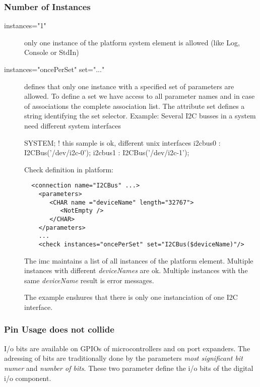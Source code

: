 \subsubsection{Number of Instances}
\begin{description}
\item[instances="1"] only one instance of the platform system element
   is allowed (like  Log, Console or StdIn)
\item[instances="oncePerSet" set="..."] defines that only one instance with a 
  specified set of parameters are allowed. To define a set we have access to 
  all parameter names and in case of associations the complete association list.
  The attribute set defines a string identifying the set selector. 
  \newline
  Example: Several I2C busses in a system need different system interfaces

  \begin{PEARLCode}
  SYSTEM;
     ! this sample is ok, different unix interfaces
     i2cbus0 : I2CBus('/dev/i2c-0');
     i2cbus1 : I2CBus('/dev/i2c-1');
  \end{PEARLCode}

  Check definition in platform:
  
  \begin{verbatim}
  <connection name="I2CBus" ...>
    <parameters>
       <CHAR name ="deviceName" length="32767">
          <NotEmpty />
       </CHAR>
    </parameters>
    ...
    <check instances="oncePerSet" set="I2CBus($deviceName)"/>
  \end{verbatim}

  The imc maintains a list of all instances of the platform element.
  Multiple instances with different \textit{deviceNames} are ok.
  Multiple instances with the same \textit{deviceName} result is
  error messages.

  The example enshures that there is only one instanciation of 
  one I2C interface. 
\end{description}

\subsubsection{Pin Usage does not collide}
I/o bits are available on GPIOs of microcontrollers and on port expanders.
The adressing of bits are traditionally done by the parameters
\textit{most significant bit numer} and
\textit{number of bits}. These two parameter define the i/o bits of the 
digital i/o component.

